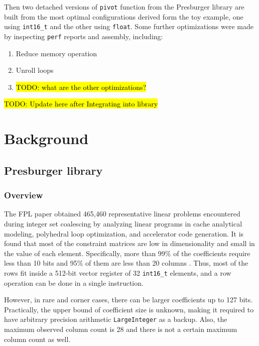 \documentclass[logo,bsc,singlespacing,parskip]{infthesis}
\newenvironment{compactlist}
{ \begin{enumerate}
    \setlength{\itemsep}{0pt}
    \setlength{\parskip}{0pt}
    \setlength{\parsep}{0pt}     
}
{ \end{enumerate} }
\begin{document}
Then two detached versions of \texttt{pivot} function from the Presburger
library are built from the most optimal configurations derived form the toy
example, one using \texttt{int16\_t} and the other using \texttt{float}. Some
further optimizations were made by inspecting \texttt{perf} reports and
assembly, including: 

\begin{compactlist} 
    \item Reduce memory operation
    \item Unroll loops
    \item\hl{TODO: what are the other optimizations?}
\end{compactlist}

\hl{TODO: Update here after Integrating into library}



\chapter{Background}
\section{Presburger library}
\subsection{Overview}

The FPL paper obtained 465,460 representative linear problems encountered during
integer set coalescing by analyzing linear programs in cache analytical
modeling, polyhedral loop optimization, and accelerator code generation. It is
found that most of the constraint matrices are low in dimensionality and small
in the value of each element. Specifically, more than 99\% of the coefficients
require less than 10 bits and 95\% of them are less than 20 columns \cite{FPL1}.
Thus, most of the rows fit inside a 512-bit vector register of 32
\texttt{int16\_t} elements, and a row operation can be done in a single
instruction. 

However, in rare and corner cases, there can be larger coefficients up to 127
bits. Practically, the upper bound of coefficient size is unknown, making it
required to have arbitrary precision arithmetic \texttt{LargeInteger} as a
backup. Also, the maximum observed column count is 28 and there is not a certain
maximum column count as well. 
\end{document}
